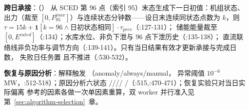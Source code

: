 \textbf{跨日承接}：（）
从 SCED 第 96 点（索引 95）末态生成下一日初值：机组状态、出力（裁至
$[0,P^{max}_{95}]$）与连续状态分钟数——设日末连续同状态点数为 $k$，则
$\tau=15k+\mathbf 1[k=96\land\text{日初状态相同}]\cdot\tau_{prev}$（:127-131）；
储能能量裁至 $[0,E^{rated}]$（:134）；水库水位、非负下泄与 96 点下泄历史（:135-138）；
直流联络线非负功率与调节方向（:139-141）。只有当日结果有效才更新承接与完成日数，
失败日任务置  且不推进（:530-532）。

\textbf{恢复与原因分析}：解释触发 （anomaly/always/manual，
异常阈值 $10^{-6}$ MW，:512-518）；原因分析六状态
////%
/（:515,:470-471）；恢复实验只对当日实际偏离
参考的因素各做一次单因素重算，双 worker 并行准入见
第~\ref{sec:algorithm-selection}~章。

